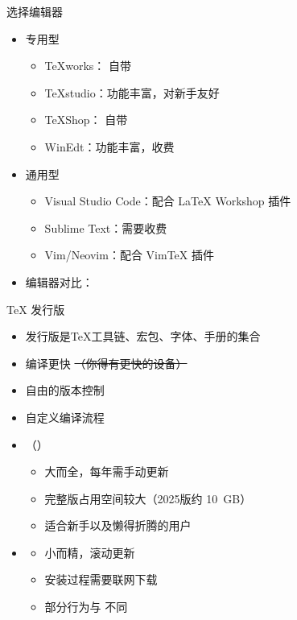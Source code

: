 \begin{frame}{选择编辑器}
\begin{itemize}
  \item<+-> 专用型
    \begin{itemize}
      \item \TeX{}works：\TeXLive{} 自带 \faWindows{} \faApple{} \faLinux{}
      \item \TeX{}studio：功能丰富，对新手友好 \faWindows{} \faApple{} \faLinux{}
      \item \TeX{}Shop：\MacTeX{} 自带 \faApple{}
      \item WinEdt：功能丰富，收费 \faWindows{}
    \end{itemize}

  \item<+-> 通用型
    \begin{itemize}
      \item Visual Studio Code：配合 LaTeX Workshop 插件
      \item Sublime Text：需要收费
      \item Vim/Neovim：配合 Vim\TeX{} 插件
    \end{itemize}

  \item<+-> 编辑器对比：
\end{itemize}
\end{frame}

\begin{frame}{\TeX{} 发行版}
  \begin{itemize}
    \item 发行版是\TeX{}工具链、宏包、字体、手册的集合 \pause
    \item 编译更快 \sout{（你得有更快的设备）}
    \item 自由的版本控制
    \item<+-> 自定义编译流程
    \item<+-> \textbf{\TeXLive{}}（\textbf{\MacTeX{}}）
      \begin{itemize}
        \item 大而全，每年需手动更新
        \item 完整版占用空间较大（2025版约 \qty{10}{GB}）
        \item 适合新手以及懒得折腾的用户
      \end{itemize}
    \item<+-> \textbf{\MiKTeX{}}
      \begin{itemize}
        \item 小而精，滚动更新
        \item 安装过程需要联网下载
        \item 部分行为与 \TeXLive{} 不同
      \end{itemize}
  \end{itemize}
\end{frame}

